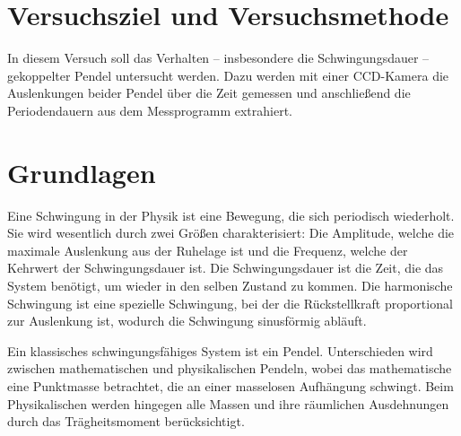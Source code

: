 \documentclass[
12pt,
a4paper,
bibliography=totocnumbered, %
BCOR=1cm, %
oneside, %
]{scrartcl}
\begin{document}
\thispagestyle{empty}



\thispagestyle{empty}

\tableofcontents

\clearpage %

\renewcommand{\thepage}{\arabic{page}}
\setcounter{page}{1}


\section[Versuchsziel]{Versuchsziel und Versuchsmethode}

In diesem Versuch soll das Verhalten -- insbesondere die Schwingungsdauer -- gekoppelter Pendel untersucht werden. Dazu werden mit einer CCD-Kamera die Auslenkungen beider Pendel über die Zeit gemessen und anschließend die Periodendauern aus dem Messprogramm extrahiert.

\section{Grundlagen}

Eine Schwingung in der Physik ist eine Bewegung, die sich periodisch wiederholt. Sie wird wesentlich durch zwei Größen charakterisiert: Die Amplitude, welche die maximale Auslenkung aus der Ruhelage ist und die Frequenz, welche der Kehrwert der Schwingungsdauer ist. Die Schwingungsdauer ist die Zeit, die das System benötigt, um wieder in den selben Zustand zu kommen. Die harmonische Schwingung ist eine spezielle Schwingung, bei der die Rückstellkraft proportional zur Auslenkung ist, wodurch die Schwingung sinusförmig abläuft.

Ein klassisches schwingungsfähiges  System ist ein Pendel. Unterschieden wird zwischen mathematischen und physikalischen Pendeln, wobei das mathematische eine Punktmasse betrachtet, die an einer masselosen Aufhängung schwingt. Beim Physikalischen werden hingegen alle Massen und ihre räumlichen Ausdehnungen durch das Trägheitsmoment berücksichtigt.
\end{document}
